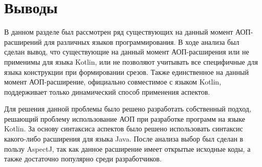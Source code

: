 \section{Выводы}
\label{sec:cap_1_conclusion}
В данном разделе был рассмотрен ряд существующих на данный момент АОП-расширений для различных языков программирования.
В ходе анализа был сделан вывод, что существующие на данный момент АОП-расширения или не применимы для языка Kotlin, или не позволяют учитывать все специфичные для языка конструкции при формировании срезов.
Также единственное на данный момент АОП-расширение, официально совместимое с языком Kotlin, поддерживает только динамический способ применения аспектов.

Для решения данной проблемы было решено разработать собственный подход, решающий
проблему использование АОП при разработке программ на языке Kotlin.
За основу синтаксиса аспектов было решено использовать синтаксис какого-либо расширения для языка Java.
После анализа выбор был сделан в пользу AspectJ, так как данное расширение имеет
открытые исходные коды, а также достаточно популярно среди разработчиков.
